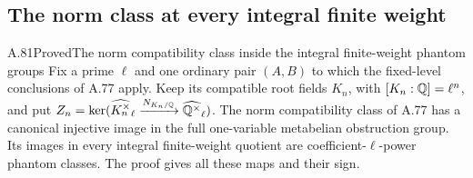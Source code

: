 \subsection{The norm class at every integral finite weight}
\begin{statement}{A.81}{Proved}{The norm compatibility class inside the integral finite-weight phantom groups}
Fix a prime $\ell$ and one ordinary pair $(A,B)$ to which
the fixed-level conclusions of A.77 apply.
Keep its compatible root fields $K_n$, with
$[K_n:\mathbb Q]=\ell^n$, and put
$Z_n=\ker(\widehat{K_n^\times}_\ell
\xrightarrow{N_{K_n/\mathbb Q}}\widehat{\mathbb Q^\times}_\ell)$.
The norm compatibility class of A.77 has a canonical
injective image in the full one-variable metabelian
obstruction group.
Its images in every integral finite-weight quotient are
coefficient-$\ell$-power phantom classes.
The proof gives all these maps and their sign.
\end{statement}
